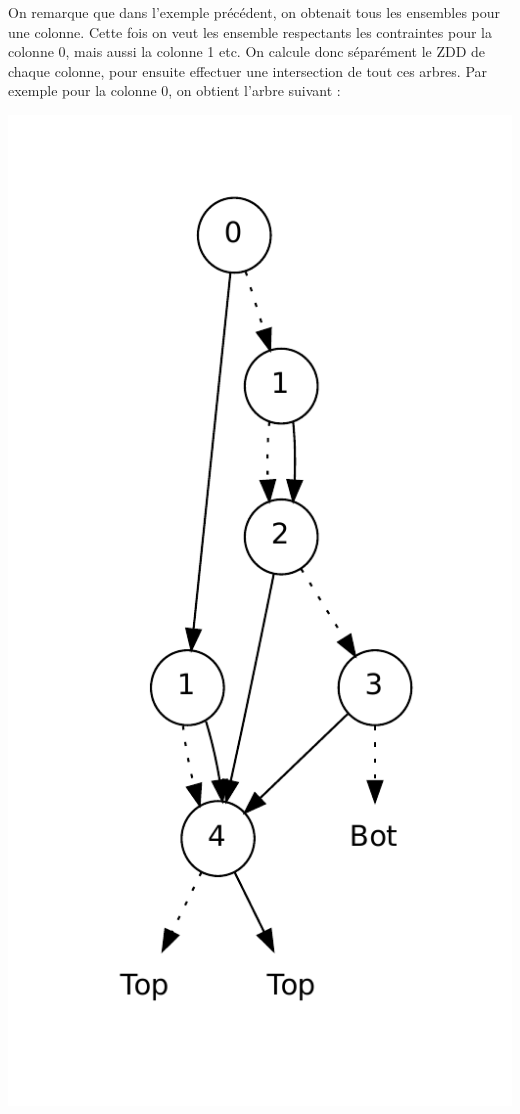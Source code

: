 \documentclass[a4paper]{article}
\begin{document}
On remarque que dans l'exemple précédent, on obtenait tous les ensembles pour
une colonne. Cette fois on veut les ensemble respectants les contraintes pour
la colonne 0, mais aussi la colonne 1 etc. On calcule donc séparément le ZDD
de chaque colonne, 
pour ensuite effectuer une intersection de tout ces arbres.
Par exemple pour la colonne 0, on obtient l'arbre suivant : 

\begin{center}
\includegraphics[scale=0.6]{../imports/column.pdf}
\end{center}
\end{document}
